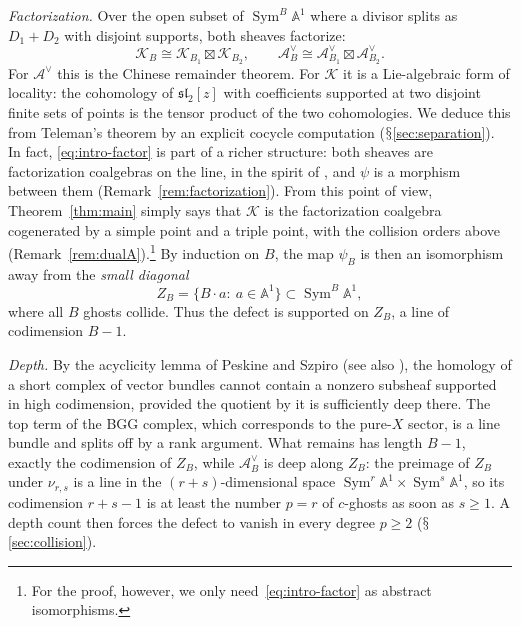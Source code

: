 \documentclass[11pt]{amsart}
\numberwithin{equation}{section}
\renewcommand{\S}{\mbox{$\mathsection$}}
\theoremstyle{definition}
\theoremstyle{remark}
\newcommand{\A}{\mathbb{A}}
\newcommand{\sltwo}{\mathfrak{sl}_2}
\newcommand{\cK}{\mathcal{K}}
\newcommand{\cA}{\mathcal{A}}
\newcommand{\Sym}{\operatorname{Sym}}
\begin{document}
\noindent\emph{Factorization.}
Over the open subset of $\Sym^B\A^1$ where a divisor splits as $D_1+D_2$ with disjoint supports, both sheaves factorize:
\begin{equation}\label{eq:intro-factor}
\cK_B\cong\cK_{B_1}\boxtimes\cK_{B_2},\qquad
\cA^\vee_B\cong\cA^\vee_{B_1}\boxtimes\cA^\vee_{B_2}.
\end{equation}
For $\cA^\vee$ this is the Chinese remainder theorem. For $\cK$ it is a Lie-algebraic form of locality: the cohomology of $\sltwo[z]$ with coefficients supported at two disjoint finite sets of points is the tensor product of the two cohomologies. We deduce this from Teleman's theorem by an explicit cocycle computation (\S\ref{sec:separation}). In fact, \eqref{eq:intro-factor} is part of a richer structure: both sheaves are factorization coalgebras on the line, in the spirit of \cite{BD04}, and $\psi$ is a morphism between them (Remark~\ref{rem:factorization}). From this point of view, Theorem~\ref{thm:main} simply says that $\cK$ is the factorization coalgebra cogenerated by a simple point and a triple point, with the collision orders above (Remark~\ref{rem:dualA}).\footnote{ For the proof, however, we only need~\eqref{eq:intro-factor} as abstract isomorphisms.} By induction on $B$, the map $\psi_B$ is then an isomorphism away from the \emph{small diagonal}
\begin{equation}\label{eq:intro-ZB}
Z_B=\{B\cdot a:\ a\in\A^1\}\subset\Sym^B\A^1,
\end{equation}
where all $B$ ghosts collide. Thus the defect is supported on $Z_B$, a line of codimension $B-1$.

\noindent\emph{Depth.}
By the acyclicity lemma of Peskine and Szpiro \cite{PS73} (see also \cite{BE73}), the homology of a short complex of vector bundles cannot contain a nonzero subsheaf supported in high codimension, provided the quotient by it is sufficiently deep there. The top term of the BGG complex, which corresponds to the pure-$X$ sector, is a line bundle and splits off by a rank argument. What remains has length $B-1$, exactly the codimension of $Z_B$, while $\cA^\vee_B$ is deep along $Z_B$: the preimage of $Z_B$ under $\nu_{r,s}$ is a line in the $(r+s)$-dimensional space $\Sym^r\A^1\times\Sym^s\A^1$, so its codimension $r+s-1$ is at least the number $p=r$ of $c$-ghosts as soon as $s\ge1$. A depth count then forces the defect to vanish in every degree $p\ge2$ (\S\ref{sec:collision}).
\end{document}
